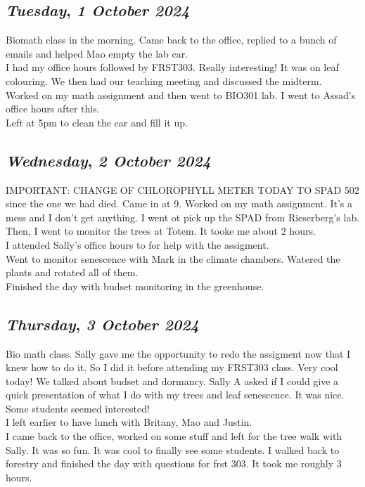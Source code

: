 \begin{center}
\section*{\month}
\end{center}

\def\day{\textit{1 October 2024}}
\def\weekday{\textit{Tuesday}}
\subsection*{\weekday, \day}
Biomath class in the morning. Came back to the office, replied to a bunch of emails and helped Mao empty the lab car.\\
I had my office hours followed by FRST303. Really interesting! It was on leaf colouring. We then had our teaching meeting and discussed the midterm.\\
Worked on my math assignment and then went to BIO301 lab. I went to Assad's office hours after this.\\
Left at 5pm to clean the car and fill it up.

\def\day{\textit{2 October 2024}}
\def\weekday{\textit{Wednesday}}
\subsection*{\weekday, \day}
IMPORTANT: CHANGE OF CHLOROPHYLL METER TODAY TO SPAD 502 since the one we had died. 
Came in at 9. Worked on my math assignment. It's a mess and I don't get anything. I went ot pick up the SPAD from Rieserberg's lab. Then, I went to monitor the trees at Totem. It tooke me about 2 hours. \\
I attended Sally's office hours to for help with the assigment.\\
Went to monitor senescence with Mark in the climate chambers. Watered the plants and rotated all of them.\\
Finished the day with budset monitoring in the greenhouse. 

\def\day{\textit{3 October 2024}}
\def\weekday{\textit{Thursday}}
\subsection*{\weekday, \day}
Bio math class. Sally gave me the opportunity to redo the assigment now that I knew how to do it. So I did it before attending my FRST303 class. Very cool today! We talked about budset and dormancy. Sally A asked if I could give a quick presentation of what I do with my trees and leaf senescence. It was nice. Some students seemed interested! \\
I left earlier to have lunch with Britany, Mao and Justin.\\
I came back to the office, worked on some stuff and left for the tree walk with Sally. It was so fun. It was cool to finally see some students. I walked back to forestry and finished the day with questions for frst 303. It took me roughly 3 hours.

